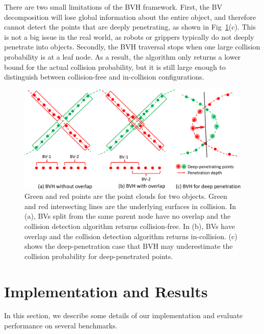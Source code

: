 There are two small limitations of the BVH framework. First, the BV decomposition will lose global information about the entire object, and therefore cannot detect the points that are deeply penetrating, as shown in Fig~\ref{fig:7:bvh_overlap}(c). This is not a big issue in the real world, as robots or grippers typically do not deeply penetrate into objects. Secondly, the BVH traversal stops when one large collision probability is at a leaf node.
As a result, the algorithm only returns a lower bound for the actual collision probability, but it is still large enough to distinguish between collision-free and in-collision configurations.

\begin{figure}[htb]
  \centering
  \includegraphics[width=0.9\linewidth]{figs/7/bvh_overlap.pdf}
  \caption[BVH acceleration for point-cloud collision]{\label{fig:7:bvh_overlap} Green and red points are the point clouds for two objects. Green and red intersecting lines are the underlying surfaces in collision. In (a), BVs split from the same parent node
  have no overlap and the collision detection algorithm returns collision-free. In (b), BVs have overlap and the collision detection algorithm returns in-collision. (c) shows the deep-penetration case that BVH may underestimate the collision probability for deep-penetrated points.}
\end{figure}


\section{Implementation and Results}
\label{sec:7:results}
In this section, we describe some details of our implementation and evaluate performance on several benchmarks.

